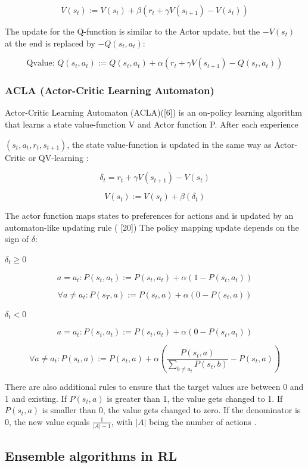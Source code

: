 \documentclass[letterpaper]{article}
\begin{document}
\[ V(s_t) := V(s_t) + \beta ( r_t + \gamma V(s_{t+1}) - V(s_t) )   \]

The update for the Q-function is similar to the Actor update, but the
\(- V(s_t)\) at the end is replaced by \(- Q(s_t, a_t)\):

\[ \textrm{Qvalue: } Q(s_t, a_t) := Q(s_t, a_t) + \alpha ( r_t + \gamma V(s_{t+1}) - Q(s_t, a_t))\]

\subsubsection{ACLA (Actor-Critic Learning
Automaton)}\label{acla-actor-critic-learning-automaton}

Actor-Critic Learning Automaton (ACLA)(\cite{wiering2008}{[}6{]}) is an
on-policy learning algorithm that learns a state value-function V and
Actor function P. After each experience

\cite{wiering2008}\((s_t, a_t, r_t, s_{t+1})\), the state value-function is
updated in the same way as Actor-Critic or QV-learning \cite{wiering2007}:

\[ \delta_t = r_t + \gamma V(s_{t+1}) - V(s_t) \]

\[ V(s_t) := V(s_t) + \beta ( \delta_t ) \]

The actor function maps states to preferences for actions and is updated
by an automaton-like updating rule (\cite{wiering2008} {[}20{]}) The policy
mapping update depends on the sign of \(\delta\):

\(\delta_t \geq 0\)

\[ a = a_t: P(s_t, a_t) := P(s_t, a_t) + \alpha ( 1 - P(s_t, a_t)) \]

\[ \forall a \neq a_t:  P(s_T, a) := P(s_t, a) + \alpha ( 0 - P(s_t, a))\]

\(\delta_t < 0\)

\[ a = a_t: P(s_t, a_t) := P(s_t, a_t) + \alpha ( 0 - P(s_t, a_t)) \]

\[ \forall a \neq a_t:  P(s_t, a) := P(s_t, a) + \alpha \left( \frac{P(s_t, a)}{\sum_{b \neq a_t}P(s_t, b)} - P(s_t, a) \right)\]

There are also additional rules to ensure that the target values are
between 0 and 1 and existing. If \(P(s_t,a)\) is greater than 1, the
value gets changed to 1. If \(P(s_t,a)\) is smaller than 0, the value
gets changed to zero. If the denominator is 0, the new value equals
\(\frac{1}{|A| -1}\), with \(|A|\) being the number of actions \cite{wiering2008}.

\subsection{Ensemble algorithms in RL}\label{ensemble-algorithms-in-rl} 
\end{document}
